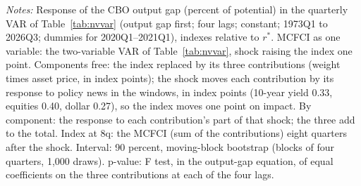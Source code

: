 \begin{table}[tbp]\centering\small
\caption{The Output Gap after a Policy Move: The MCFCI and Its Components}\label{tab:nvcomp}
\begin{flushleft}\footnotesize\textit{Notes:} Response of the CBO output gap (percent of potential) in the quarterly VAR of Table~\ref{tab:nvvar} (output gap first; four lags; constant; 1973Q1 to 2026Q3; dummies for 2020Q1--2021Q1), indexes relative to $r^*$. MCFCI as one variable: the two-variable VAR of Table~\ref{tab:nvvar}, shock raising the index one point. Components free: the index replaced by its three contributions (weight times asset price, in index points); the shock moves each contribution by its response to policy news in the windows, in index points (10-year yield 0.33, equities 0.40, dollar 0.27), so the index moves one point on impact. By component: the response to each contribution's part of that shock; the three add to the total. Index at 8q: the MCFCI (sum of the contributions) eight quarters after the shock. Interval: 90 percent, moving-block bootstrap (blocks of four quarters, 1,000 draws). p-value: F test, in the output-gap equation, of equal coefficients on the three contributions at each of the four lags.\end{flushleft}
\end{table}
